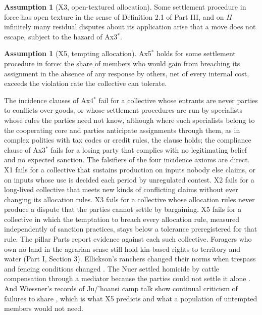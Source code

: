 \documentclass[11pt,letterpaper]{article}
\theoremstyle{definition}
\newtheorem{assumption}[theorem]{Assumption}
\theoremstyle{remark}
\begin{document}
\begin{assumption}[X3, open-textured allocation]
\label{ass:formalized-state:X3}
Some settlement procedure in force has open texture in the sense of Definition 2.1 of Part III, and on $\Pi$ infinitely many residual disputes about its application arise that a move does not escape, subject to the hazard of Ax3$^{*}$.
\end{assumption}

\begin{assumption}[X5, tempting allocation]
\label{ass:formalized-state:X5}
Ax5$^{*}$ holds for some settlement procedure in force: the share of members who would gain from breaching its assignment in the absence of any response by others, net of every internal cost, exceeds the violation rate the collective can tolerate.
\end{assumption}

The incidence clauses of Ax4$^{*}$ fail for a collective whose entrants are never parties to conflicts over goods, or whose settlement procedures are run by specialists whose rules the parties need not know, although where such specialists belong to the cooperating core and parties anticipate assignments through them, as in complex polities with tax codes or credit rules, the clause holds; the compliance clause of Ax3$^{*}$ fails for a losing party that complies with no legitimating belief and no expected sanction. The falsifiers of the four incidence axioms are direct. X1 fails for a collective that sustains production on inputs nobody else claims, or on inputs whose use is decided each period by unregulated contest. X2 fails for a long-lived collective that meets new kinds of conflicting claims without ever changing its allocation rules. X3 fails for a collective whose allocation rules never produce a dispute that the parties cannot settle by bargaining. X5 fails for a collective in which the temptation to breach every allocation rule, measured independently of sanction practices, stays below a tolerance preregistered for that rule. The pillar Parts report evidence against each such collective. Foragers who own no land in the agrarian sense still hold kin-based rights to territory and water (Part I, Section 3). Ellickson's ranchers changed their norms when trespass and fencing conditions changed \citep{ellickson1991}. The Nuer settled homicide by cattle compensation through a mediator because the parties could not settle it alone \citep{evanspritchard1940}. And Wiessner's records of Ju/'hoansi camp talk show continual criticism of failures to share \citep{wiessner2005}, which is what X5 predicts and what a population of untempted members would not need.
\end{document}
